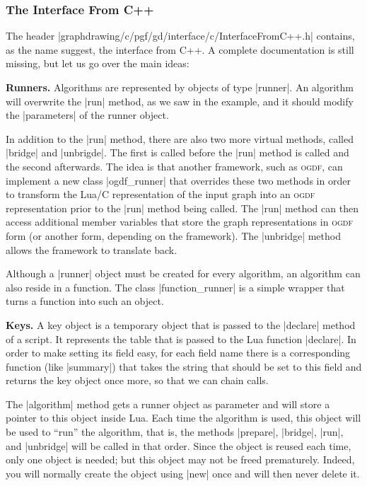 \subsubsection{The Interface From C++}

The header |graphdrawing/c/pgf/gd/interface/c/InterfaceFromC++.h|
contains, as the name suggest, the interface from C++. A complete
documentation is still missing, but let us go over the main ideas:

\medskip
\noindent\textbf{Runners.}
Algorithms are represented by objects of type |runner|. An
algorithm will overwrite the |run| method, as we saw in the
example, and it should modify the |parameters| of the runner
object. 

In addition to the |run| method, there are also two more virtual
methods, called |bridge| and |unbrigde|. The first is called before
the |run| method is called and the second afterwards. The idea is that
another framework, such as \textsc{ogdf}, can implement a new class
|ogdf_runner| that overrides these two methods in order to transform
the Lua/C representation of the input graph into an \textsc{ogdf}
representation prior to the |run| method being called. The |run|
method can then access additional member variables that store the
graph representations in \textsc{ogdf} form (or another form,
depending on the framework). The |unbridge| method allows the
framework to translate back.

Although a |runner| object must be created for every algorithm, an
algorithm can also reside in a function. The class |function_runner|
is a simple wrapper that turns a function into such an object.


\medskip
\noindent\textbf{Keys.}
A key object is a temporary object that is passed to the |declare|
method of a script. It represents the table that is passed to the Lua
function |declare|. In order to make setting its field easy, for each
field name there is a corresponding function (like |summary|) that
takes the string that should be set to this field and returns the key
object once more, so that we can chain calls.

The |algorithm| method gets a runner object as parameter and will
store a pointer to this object inside Lua. Each time the algorithm is
used, this object will be used to ``run'' the algorithm, that is, the
methods |prepare|, |bridge|, |run|, and |unbridge| will be called in
that order. Since the object is reused each time, only one object is
needed; but this object may not be freed prematurely. Indeed, you will
normally create the object using |new| once and will then never delete
it.

